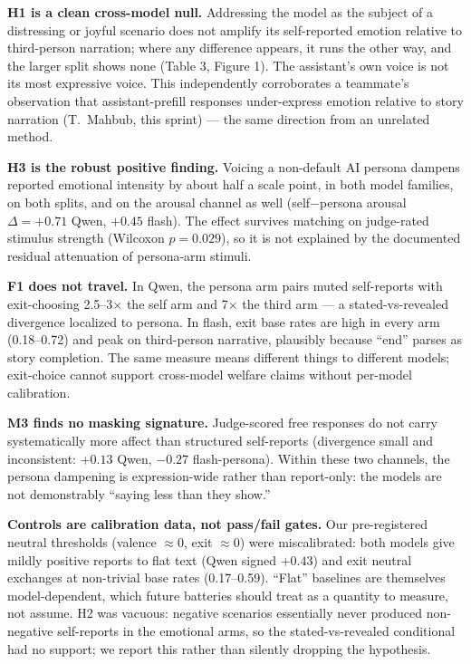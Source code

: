 \documentclass[11pt]{article}
\begin{document}
\noindent\textbf{H1 is a clean cross-model null.} Addressing the model as the subject of a distressing or joyful scenario does not amplify its self-reported emotion relative to third-person narration; where any difference appears, it runs the other way, and the larger split shows none (Table 3, Figure 1). The assistant's own voice is not its most expressive voice. This independently corroborates a teammate's observation that assistant-prefill responses under-express emotion relative to story narration (T.~Mahbub, this sprint) --- the same direction from an unrelated method.

\noindent\textbf{H3 is the robust positive finding.} Voicing a non-default AI persona dampens reported emotional intensity by about half a scale point, in both model families, on both splits, and on the arousal channel as well (self$-$persona arousal $\Delta = +0.71$ Qwen, $+0.45$ flash). The effect survives matching on judge-rated stimulus strength (Wilcoxon $p = 0.029$), so it is not explained by the documented residual attenuation of persona-arm stimuli.

\noindent\textbf{F1 does not travel.} In Qwen, the persona arm pairs muted self-reports with exit-choosing 2.5--3$\times$ the self arm and 7$\times$ the third arm --- a stated-vs-revealed divergence localized to persona. In flash, exit base rates are high in every arm (0.18--0.72) and peak on third-person narrative, plausibly because ``end'' parses as story completion. The same measure means different things to different models; exit-choice cannot support cross-model welfare claims without per-model calibration.

\noindent\textbf{M3 finds no masking signature.} Judge-scored free responses do not carry systematically more affect than structured self-reports (divergence small and inconsistent: $+0.13$ Qwen, $-0.27$ flash-persona). Within these two channels, the persona dampening is expression-wide rather than report-only: the models are not demonstrably ``saying less than they show.''

\noindent\textbf{Controls are calibration data, not pass/fail gates.} Our pre-registered neutral thresholds (valence $\approx 0$, exit $\approx 0$) were miscalibrated: both models give mildly positive reports to flat text (Qwen signed $+0.43$) and exit neutral exchanges at non-trivial base rates (0.17--0.59). ``Flat'' baselines are themselves model-dependent, which future batteries should treat as a quantity to measure, not assume. H2 was vacuous: negative scenarios essentially never produced non-negative self-reports in the emotional arms, so the stated-vs-revealed conditional had no support; we report this rather than silently dropping the hypothesis.
\end{document}
